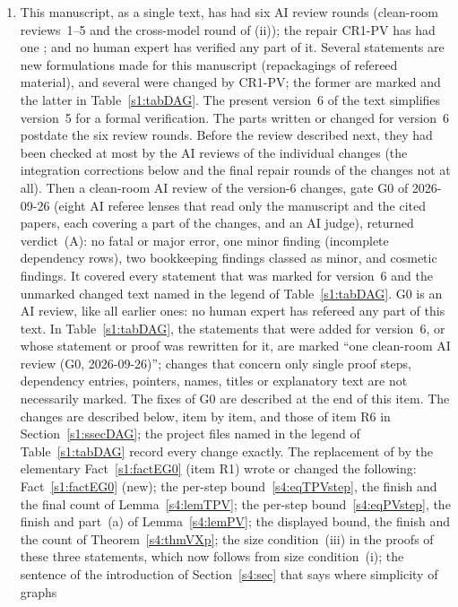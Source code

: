 \begin{remark}
\begin{enumerate}
\item[(iii)] This manuscript, as a single text, has had six AI review rounds
(clean-room reviews~1--5 and the cross-model round of (ii)); the repair \textsf{CR1-PV} has had one
; and no human expert has verified any part of it. Several statements are
new formulations made for this manuscript (repackagings of refereed material),
and several were changed by \textsf{CR1-PV}; the former are marked  and
the latter  in Table~\ref{s1:tabDAG}.
The present version~6 of the text simplifies version~5 for a formal
verification. The parts written or changed for version~6 postdate the six
review rounds. Before the review described next, they had been checked at most
by the AI reviews of the individual changes (the integration corrections below
and the final repair rounds of the changes not at all). Then a clean-room AI
review of the version-6 changes, gate G0 of 2026-09-26 (eight AI referee
lenses that read only the manuscript and the cited papers, each covering a part
of the changes, and an AI judge), returned verdict~(A): no fatal or major
error, one minor finding (incomplete dependency rows), two bookkeeping findings
classed as minor, and cosmetic findings. It covered every statement that was
marked for version~6 and the unmarked changed text named in the legend of
Table~\ref{s1:tabDAG}. G0 is an AI review, like all earlier ones: no human
expert has refereed any part of this text. In
Table~\ref{s1:tabDAG}, the statements that were added for version~6, or whose
statement or proof was rewritten for it, are marked ``one clean-room AI review
(G0, 2026-09-26)''; changes
that concern only single proof steps, dependency entries, pointers, names,
titles or explanatory text are not necessarily marked. The fixes of G0 are
described at the end of this item. The changes are described below,
item by item, and those of item R6 in Section~\ref{s1:ssecDAG}; the project
files named in the legend of Table~\ref{s1:tabDAG} record every change
exactly. The replacement of
\cite[Theorem~2]{BM} by the elementary Fact~\ref{s1:factEG0} (item R1) wrote or
changed the following: Fact~\ref{s1:factEG0} (new); the per-step
bound~\eqref{s4:eqTPVstep}, the finish and the final count of
Lemma~\ref{s4:lemTPV}; the per-step bound~\eqref{s4:eqPVstep}, the finish and
part~(a) of Lemma~\ref{s4:lemPV}; the displayed bound, the finish and the count
of Theorem~\ref{s4:thmVXp}; the size condition~(iii) in the proofs of these
three statements, which now follows from size condition~(i); the sentence of
the introduction of Section~\ref{s4:sec} that says where simplicity of graphs

\end{enumerate}
\end{remark}
